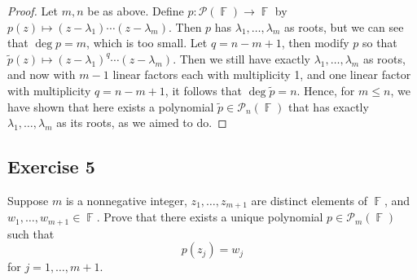 \documentclass[letterpaper, 12pt]{amsart}
\DeclareMathOperator{\F}{\mathbb{F}}				%
\theoremstyle{definition}  							%
\begin{document}
		\begin{proof}
		Let $m,n$ be as above.
		Define $p: \mathcal{P}(\F) \to \F$ by $p(z) \mapsto (z - \lambda_{1})\cdots(z - \lambda_{m})$.
		Then $p$ has $\lambda_{1}, \dots, \lambda_{m}$ as roots, but we can see that $\deg p = m$, which is too small.
		Let $q = n-m+1$, then modify $p$ so that $\tilde{p}(z) \mapsto (z - \lambda_{1})^{q} \cdots (z - \lambda_{m})$.
		Then we still have exactly $\lambda_{1}, \dots, \lambda_{m}$ as roots, and now with $m-1$ linear factors each with multiplicity 1, and one linear factor with multiplicity $q = n-m+1$, it follows that $\deg \tilde{p} = n$.
		Hence, for $m \leq n$, we have shown that here exists a polynomial $\tilde{p} \in \mathcal{P}_{n}(\F)$ that has exactly $\lambda_{1}, \dots, \lambda_{m}$ as its roots, as we aimed to do.
		\end{proof}

		\subsection*{Exercise 5}
		Suppose $m$ is a nonnegative integer, $z_{1}, \dots, z_{m+1}$ are distinct elements of $\F$, and $w_{1}, \dots, w_{m+1} \in \F$.
		Prove that there exists a unique polynomial $p \in \mathcal{P}_{m}(\F)$ such that $$p(z_{j}) = w_{j}$$ for $j = 1, \dots, m+1$.
\end{document}
